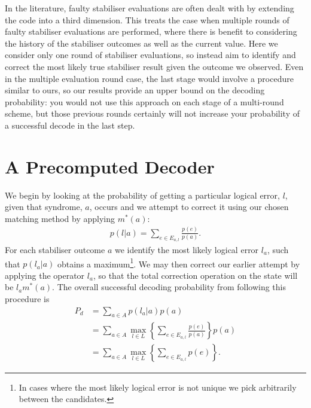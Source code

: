 In the literature, faulty stabiliser evaluations are often dealt with by extending the code into a third dimension. This treats the case when multiple rounds of faulty stabiliser evaluations are performed, where there is benefit to considering the history of the stabiliser outcomes as well as the current value. Here we consider only one round of stabiliser evaluations, so instead aim to identify and correct the most likely true stabiliser result given the outcome we observed. Even in the multiple evaluation round case, the last stage would involve a procedure similar to ours, so our results provide an upper bound on the decoding probability: you would not use this approach on each stage of a multi-round scheme, but those previous rounds certainly will not increase your probability of a successful decode in the last step.

\section{A Precomputed Decoder}

We begin by looking at the probability of getting a particular logical error, $l$, given that syndrome, $a$, occurs and we attempt to correct it using our chosen matching method by applying $m^*(a)$:
\begin{align}
  p(l \vert a) = \sum_{e \in E_{a,l}} \frac{p(e)}{p(a)}. 
\end{align}
For each stabiliser outcome $a$ we identify the most likely logical error $l_a$, such that $p(l_a \vert a)$ obtains a maximum\footnote{In cases where the most likely logical error is not unique we pick arbitrarily between the candidates.}. We may then correct our earlier attempt by applying the operator $l_a$, so that the total correction operation on the state will be $l_am^*(a)$. The overall successful decoding probability from following this procedure is 
\begin{align}
  P_d &= \sum_{a \in A} p(l_a \vert a)p(a) \\
  &= \sum_{a \in A} \max_{l\in L} \left\{ \sum_{e \in E_{a,l}} \frac{p(e)}{p(a)} \right\} p(a) \\
  &= \sum_{a \in A} \max_{l\in L} \left\{ \sum_{e \in E_{a,l}} p(e) \right\}. \label{truthful_prob}
\end{align}

